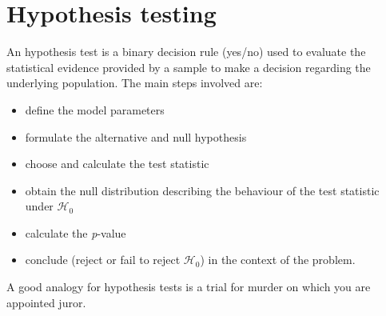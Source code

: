 \documentclass[
  11pt,
  letterpaper,
]{scrbook}
\providecommand{\tightlist}{%
  \setlength{\itemsep}{0pt}\setlength{\parskip}{0pt}}\usepackage{longtable,booktabs,array}
\theoremstyle{definition}
\theoremstyle{remark}
\begin{document}
\hypertarget{tests}{%
\section{Hypothesis testing}\label{tests}}

An hypothesis test is a binary decision rule (yes/no) used to evaluate
the statistical evidence provided by a sample to make a decision
regarding the underlying population. The main steps involved are:

\begin{itemize}
\tightlist
\item
  define the model parameters
\item
  formulate the alternative and null hypothesis
\item
  choose and calculate the test statistic
\item
  obtain the null distribution describing the behaviour of the test
  statistic under \(\mathscr{H}_0\)
\item
  calculate the \emph{p}-value
\item
  conclude (reject or fail to reject \(\mathscr{H}_0\)) in the context
  of the problem.
\end{itemize}

A good analogy for hypothesis tests is a trial for murder on which you
are appointed juror.
\end{document}
